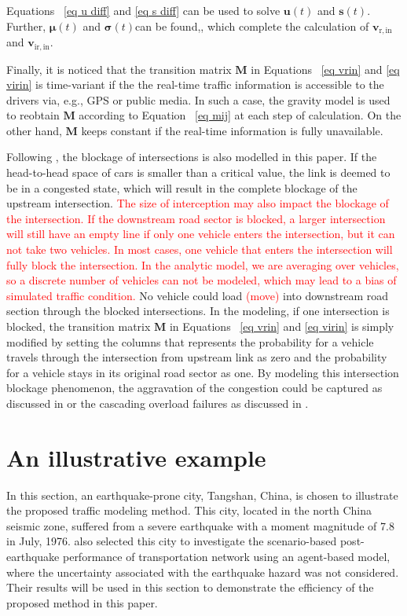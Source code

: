 \documentclass[review,11pt,nonatbib]{elsarticle}
\begin{document}
Equations ~\eqref{eq u diff} and \eqref{eq s diff} can be used to solve $\mathbf{u}(t)$ and $\mathbf{s}(t)$. Further, $\bm{\mu}(t)$ and $\bm{\sigma}(t)$can be found,, which complete the calculation of $\mathbf{v}_{\mathrm{r,in}}$ and $\mathbf{v}_{\mathrm{ir,in}}$.
\par Finally, it is noticed that the transition matrix $\mathbf{M}$ in Equations ~\eqref{eq vrin} and \eqref{eq virin} is time-variant if the the real-time traffic information is accessible to the drivers via, e.g., GPS or public media. In such a case, the gravity model is used to reobtain $\mathbf{M}$ according to Equation ~\eqref{eq mij} at each step of calculation. On the other hand, $\mathbf{M}$ keeps constant if the real-time information is fully unavailable.

\par Following \citep{feng2017post}, the blockage of intersections is also modelled in this paper. If the head-to-head space of cars is smaller than a critical value, the link is deemed to be in a congested state, which will result in the complete blockage of the upstream intersection. \textcolor{red}{The size of interception may also impact the blockage of the intersection. If the downstream road sector is blocked, a larger intersection will still have an empty line if only one vehicle enters the intersection, but it can not take two vehicles. In most cases, one vehicle that enters the intersection will fully block the intersection. In the analytic model, we are averaging over vehicles, so a discrete number of vehicles can not be modeled, which may lead to a bias of simulated traffic condition.} No vehicle could load \textcolor{red}{(move)} into downstream road section through the blocked intersections. In the modeling, if one intersection is blocked,  the transition matrix $\mathbf{M}$  in Equations ~\eqref{eq vrin} and \eqref{eq virin} is simply modified by setting the columns that represents the probability for a vehicle travels through the intersection from upstream link as zero and the probability for a vehicle stays in its original road sector as one. By modeling this intersection blockage phenomenon, the aggravation of the congestion could be captured as discussed in \citep{feng2017post} or the cascading overload failures as discussed in \citep{zhao2016spatio}.

\section{An illustrative example}
In this section, an earthquake-prone city, Tangshan, China, is chosen to illustrate the proposed traffic modeling method. This city, located in the north China seismic zone, suffered from a severe earthquake with a moment magnitude of 7.8 in July, 1976.  \citet{feng2017post} also selected this city to investigate the scenario-based post-earthquake performance of transportation network using an agent-based model, where the uncertainty associated with the earthquake hazard was not considered. Their results will be used in this section to demonstrate the efficiency of the proposed method in this paper.
\end{document}
